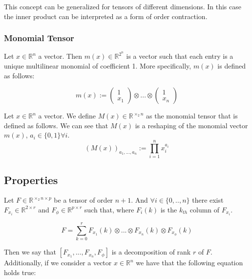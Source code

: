 \documentclass{article}
\begin{document}
This concept can be generalized for tensors of different dimensions. 
In this case the inner product can be interpreted as a form of order contraction.

\subsubsection*{Monomial Tensor}

Let $x \in \mathbb{R}^n$ a vector. Then $m(x) \in \mathbb{R}^{2^n}$ is a vector 
such that each entry is a unique multilinear monomial of coefficient 1.
More specifically, $m(x)$ is defined as follows:

\begin{equation}
    m(x) := \begin{pmatrix}
        1 \\
        x_1
    \end{pmatrix}
    \otimes ... \otimes
    \begin{pmatrix}
        1 \\
        x_n
    \end{pmatrix}
\end{equation}

Let $x \in \mathbb{R}^n$ a vector. We define $M(x) \in \mathbb{R}^{\times_2 n}$ as the monomial 
tensor that is defined as follows. We can see that $M(x)$ is a reshaping of the monomial vector
$m(x)$, $a_i \in \{0,1\} \forall i$.
\begin{equation}
    (M(x))_{a_1, ..., a_n} := \prod_{i=1}^{n} x_i^{a_i}
\end{equation}

\subsection{Properties}

Let $F \in \mathbb{R}^{\times_2 n \times p}$ be a tensor of order $n+1$.
And $\forall i \in \{0,..,n\} $ there exist $F_{x_i} \in \mathbb{R}^{2 \times r}$
and $F_\phi  \in \mathbb{R}^{p \times r}$ such that, where $F_{i}(k)$ is the $k_{th}$
column of $F_{x_i}$. 

\begin{equation}
    F = \sum_{k = 0}^r F_{x_1}(k) \otimes ... \otimes F_{x_n}(k) \otimes F_{x_\phi}(k) 
\end{equation}

Then we say that $[F_{x_1}, ..., F_{x_n}, F_\phi]$ is a decomposition of rank $r$ 
of $F$. Additionally, if we consider a vector $x \in \mathbb{R}^n$ we have that 
the following equation holds true:
\end{document}
